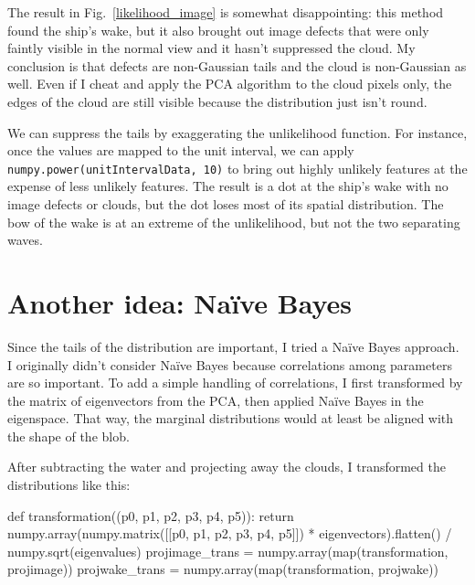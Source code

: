 \documentclass[12pt]{article}
\begin{document}
The result in Fig.~\ref{likelihood_image} is somewhat disappointing:
this method found the ship's wake, but it also brought out image
defects that were only faintly visible in the normal view and it
hasn't suppressed the cloud.  My conclusion is that defects are
non-Gaussian tails and the cloud is non-Gaussian as well.  Even if I
cheat and apply the PCA algorithm to the cloud pixels only, the edges
of the cloud are still visible because the distribution just isn't
round.

We can suppress the tails by exaggerating the unlikelihood function.
For instance, once the values are mapped to the unit interval, we can
apply {\tt numpy.power(unitIntervalData, 10)} to bring out highly
unlikely features at the expense of less unlikely features.  The
result is a dot at the ship's wake with no image defects or clouds,
but the dot loses most of its spatial distribution.  The bow of the
wake is at an extreme of the unlikelihood, but not the two separating
waves.

\section{Another idea: Na\"ive Bayes}

Since the tails of the distribution are important, I tried a Na\"ive
Bayes approach.  I originally didn't consider Na\"ive Bayes because
correlations among parameters are so important.  To add a simple handling of
correlations, I first transformed by the matrix of eigenvectors from
the PCA, then applied Na\"ive Bayes in the eigenspace.  That way, the
marginal distributions would at least be aligned with the shape of the
blob.

After subtracting the water and projecting away the clouds, I
transformed the distributions like this:
\begin{python}
def transformation((p0, p1, p2, p3, p4, p5)):
    return numpy.array(numpy.matrix([[p0, p1, p2, p3, p4, p5]])
        * eigenvectors).flatten() / numpy.sqrt(eigenvalues)
projimage_trans = numpy.array(map(transformation, projimage))
projwake_trans = numpy.array(map(transformation, projwake))
\end{python}
\end{document}
